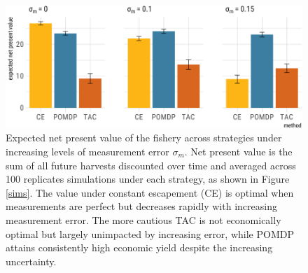 \documentclass[3p]{elsarticle} %
\makeatletter
\def\maxwidth{\ifdim\Gin@nat@width>\linewidth\linewidth
\else\Gin@nat@width\fi}
\let\Oldincludegraphics\includegraphics
\renewcommand{\includegraphics}[1]{\Oldincludegraphics[width=\maxwidth]{#1}}
\makeatother
\begin{document}
\begin{figure}
\centering
\includegraphics{manuscript_files/figure-latex/econ-1.pdf}
\caption{Expected net present value of the fishery across strategies
under increasing levels of measurement error \(\sigma_m\). Net present
value is the sum of all future harvests discounted over time and
averaged across 100 replicates simulations under each strategy, as shown
in Figure \ref{sims}. The value under constant escapement (CE) is
optimal when measurements are perfect but decreases rapidly with
increasing measurement error. The more cautious TAC is not economically
optimal but largely unimpacted by increasing error, while POMDP attains
consistently high economic yield despite the increasing uncertainty.
\label{econ}}
\end{figure}
\end{document}
